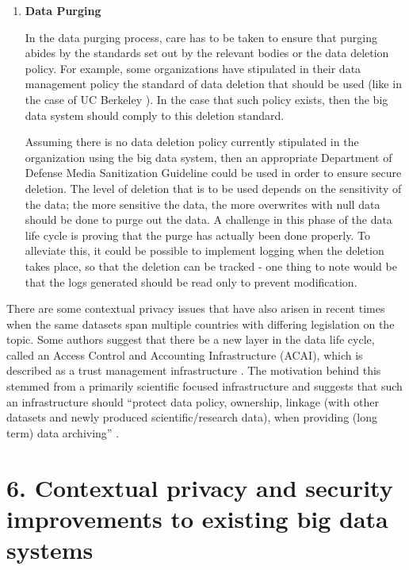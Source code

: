 \documentclass{sigchi}
\begin{document}
\begin{enumerate}
\item \textbf{Data Purging}

In the data purging process, care has to be taken to ensure that purging abides by the standards set out by the relevant bodies or the data deletion policy. For example, some organizations have stipulated in their data management policy the standard of data deletion that should be used (like in the case of UC Berkeley \cite{berkeley_delete}). In the case that such policy exists, then the big data system should comply to this deletion standard. 

Assuming there is no data deletion policy currently stipulated in the organization using the big data system, then an appropriate Department of Defense Media Sanitization Guideline could be used in order to ensure secure deletion. The level of deletion that is to be used depends on the sensitivity of the data; the more sensitive the data, the more overwrites with null data should be done to purge out the data. A challenge in this phase of the data life cycle is proving that the purge has actually been done properly\cite{11_chisholm_2015}. To alleviate this, it could be possible to implement logging when the deletion takes place, so that the deletion can be tracked - one thing to note would be that the logs generated should be read only to prevent modification.

\end{enumerate}

There are some contextual privacy issues that have also arisen in recent times when the same datasets span multiple countries with differing legislation on the topic. Some authors suggest that there be a new layer in the data life cycle, called an Access Control and Accounting Infrastructure (ACAI), which is described as a trust management infrastructure \cite{demchenko2015cloud}. The motivation behind this stemmed from a primarily scientific focused infrastructure and suggests that such an infrastructure should ``protect data policy, ownership, linkage (with other datasets and newly produced scientific/research data), when providing (long term) data archiving'' \cite{demchenko2015cloud}.


\section{6. Contextual privacy and security improvements to existing big data systems}
\end{document}
